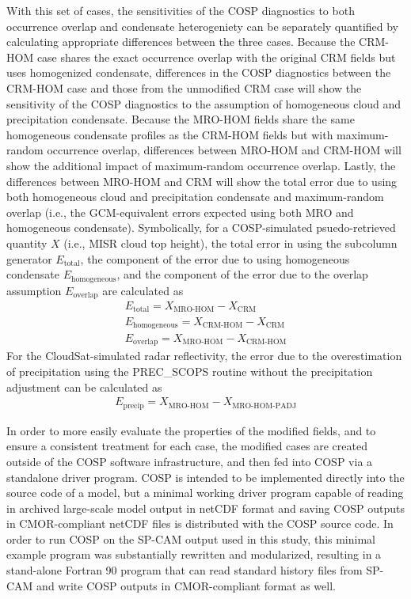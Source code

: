 With this set of cases, the sensitivities of the COSP diagnostics to
both occurrence overlap and condensate heterogeniety can be separately
quantified by calculating appropriate differences between the three
cases. Because the CRM-HOM case shares the exact occurrence overlap with
the original CRM fields but uses homogenized condensate, differences in
the COSP diagnostics between the CRM-HOM case and those from the
unmodified CRM case will show the sensitivity of the COSP diagnostics to
the assumption of homogeneous cloud and precipitation condensate.
Because the MRO-HOM fields share the same homogeneous condensate
profiles as the CRM-HOM fields but with maximum-random occurrence
overlap, differences between MRO-HOM and CRM-HOM will show the
additional impact of maximum-random occurrence overlap. Lastly, the
differences between MRO-HOM and CRM will show the total error due to
using both homogeneous cloud and precipitation condensate and
maximum-random overlap (i.e., the GCM-equivalent errors expected using
both MRO and homogeneous condensate). Symbolically, for a COSP-simulated
psuedo-retrieved quantity \(X\) (i.e., MISR cloud top height), the total
error in using the subcolumn generator \(E_\textrm{total}\), the
component of the error due to using homogeneous condensate
\(E_\textrm{homogeneous}\), and the component of the error due to the
overlap assumption \(E_\textrm{overlap}\) are calculated as
\[\begin{gathered} E_\textrm{total} = X_\textrm{MRO-HOM} -
X_\textrm{CRM} \\ E_\textrm{homogeneous} = X_\textrm{CRM-HOM} - X_\textrm{CRM}
\\ E_\textrm{overlap} = X_\textrm{MRO-HOM} - X_\textrm{CRM-HOM}\end{gathered}\]
For the CloudSat-simulated radar reflectivity, the error due to the
overestimation of precipitation using the PREC\_SCOPS routine without
the precipitation adjustment can be calculated as \[\begin{gathered}
E_\textrm{precip} = X_\textrm{MRO-HOM} - X_\textrm{MRO-HOM-PADJ}\end{gathered}\]

In order to more easily evaluate the properties of the modified fields,
and to ensure a consistent treatment for each case, the modified cases
are created outside of the COSP software infrastructure, and then fed
into COSP via a standalone driver program. COSP is intended to be
implemented directly into the source code of a model, but a minimal
working driver program capable of reading in archived large-scale model
output in netCDF format and saving COSP outputs in CMOR-compliant netCDF
files is distributed with the COSP source code. In order to run COSP on
the SP-CAM output used in this study, this minimal example program was
substantially rewritten and modularized, resulting in a stand-alone
Fortran 90 program that can read standard history files from SP-CAM and
write COSP outputs in CMOR-compliant format as well.


